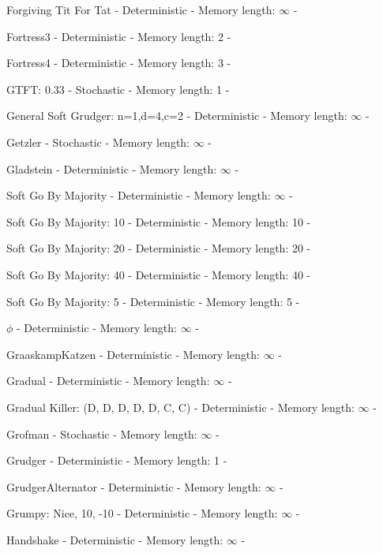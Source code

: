 \item Forgiving Tit For Tat - Deterministic - Memory length: \(\infty\) - \cite{Knight2018}
\item Fortress3 - Deterministic - Memory length: 2 - \cite{Ashlock2006b}
\item Fortress4 - Deterministic - Memory length: 3 - \cite{Ashlock2006b}
\item GTFT: 0.33 - Stochastic - Memory length: 1 - \cite{Nowak1993, Gaudesi2016}
\item General Soft Grudger: n=1,d=4,c=2 - Deterministic - Memory length: \(\infty\) - \cite{Knight2018}
\item Getzler - Stochastic - Memory length: \(\infty\) - \cite{Axelrod1980b}
\item Gladstein - Deterministic - Memory length: \(\infty\) - \cite{Axelrod1980b}
\item Soft Go By Majority - Deterministic - Memory length: \(\infty\) - \cite{Axelrod1984, Mittal2009, Axelrod1980b}
\item Soft Go By Majority: 10 - Deterministic - Memory length: 10 - \cite{Knight2018}
\item Soft Go By Majority: 20 - Deterministic - Memory length: 20 - \cite{Knight2018}
\item Soft Go By Majority: 40 - Deterministic - Memory length: 40 - \cite{Knight2018}
\item Soft Go By Majority: 5 - Deterministic - Memory length: 5 - \cite{Knight2018}
\item $\phi$ - Deterministic - Memory length: \(\infty\) - \cite{Knight2018}
\item GraaskampKatzen - Deterministic - Memory length: \(\infty\) - \cite{Axelrod1980b}
\item Gradual - Deterministic - Memory length: \(\infty\) - \cite{Beaufils1997}
\item Gradual Killer: (D, D, D, D, D, C, C) - Deterministic - Memory length: \(\infty\) - \cite{Prison1998}
\item Grofman - Stochastic - Memory length: \(\infty\) - \cite{Axelrod1980}
\item Grudger - Deterministic - Memory length: 1 - \cite{Li2011, Axelrod1980, Berg2015, Banks1990, Beaufils1997}
\item GrudgerAlternator - Deterministic - Memory length: \(\infty\) - \cite{Prison1998}
\item Grumpy: Nice, 10, -10 - Deterministic - Memory length: \(\infty\) - \cite{Knight2018}
\item Handshake - Deterministic - Memory length: \(\infty\) - \cite{Robson1990}
